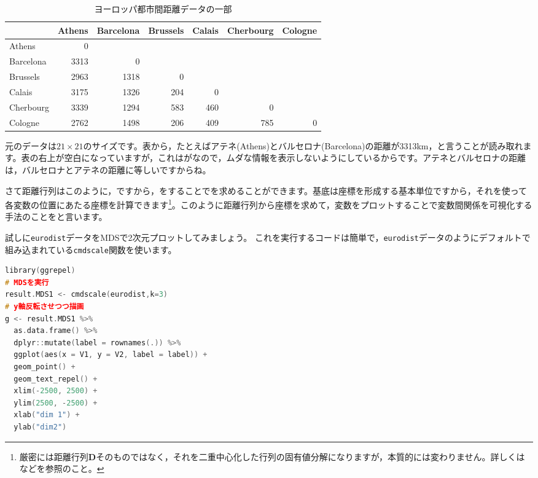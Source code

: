 \documentclass{ltjsbook}
\begin{document}
\begin{table}[ht]
	\centering
	\caption{ヨーロッパ都市間距離データの一部}
	\begin{tabular}{l|rrrrrr}
		          & Athens & Barcelona & Brussels & Calais & Cherbourg & Cologne \\
		\hline
		Athens    & 0      &           &          &        &           &         \\
		Barcelona & 3313   & 0         &          &        &           &         \\
		Brussels  & 2963   & 1318      & 0        &        &           &         \\
		Calais    & 3175   & 1326      & 204      & 0      &           &         \\
		Cherbourg & 3339   & 1294      & 583      & 460    & 0         &         \\
		Cologne   & 2762   & 1498      & 206      & 409    & 785       & 0       \\
		\hline
	\end{tabular}
	\label{tbl:15_01}
\end{table}

元のデータは$21 \times 21$のサイズです。表から，たとえばアテネ(Athens)とバルセロナ(Barcelona)の距離が3313km，と言うことが読み取れます。表の右上が空白になっていますが，これはがなので，ムダな情報を表示しないようにしているからです。アテネとバルセロナの距離は，バルセロナとアテネの距離に等しいですからね。

さて距離行列はこのように，ですから，をすることでを求めることができます。基底は座標を形成する基本単位ですから，それを使って各変数の位置にあたる座標を計算できます\footnote{厳密には距離行列$\bm{D}$そのものではなく，それを二重中心化した行列の固有値分解になりますが，本質的には変わりません。詳しくは\textcite{Okada19940115}などを参照のこと。}。このように距離行列から座標を求めて，変数をプロットすることで変数間関係を可視化する手法のことをと言います。

試しに\texttt{eurodist}データをMDSで2次元プロットしてみましょう。
これを実行するコードは簡単で，\texttt{eurodist}データのようにデフォルトで組み込まれている\texttt{cmdscale}関数を使います。

\begin{lstlisting}[language=C++,label={code:15_01},caption={計量MDSの実践と描画}]
library(ggrepel)
# MDSを実行
result.MDS1 <- cmdscale(eurodist,k=3)
# y軸反転させつつ描画
g <- result.MDS1 %>%
  as.data.frame() %>%
  dplyr::mutate(label = rownames(.)) %>%
  ggplot(aes(x = V1, y = V2, label = label)) +
  geom_point() +
  geom_text_repel() +
  xlim(-2500, 2500) +
  ylim(2500, -2500) +
  xlab("dim 1") +
  ylab("dim2")
\end{lstlisting}
\end{document}
